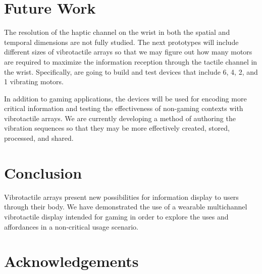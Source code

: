 \documentclass{chi-ext}
\begin{document}
\section{Future Work}
The resolution of the haptic channel on the wrist in both the spatial and temporal dimensions are not fully studied. The next prototypes will include different sizes of vibrotactile arrays so that we may figure out how many motors are required to maximize the information reception through the tactile channel in the wrist. Specifically, are going to build and test devices that include 6, 4, 2, and 1 vibrating motors. 

In addition to gaming applications, the devices will be used for encoding more critical information and testing the effectiveness of non-gaming contexts with vibrotactile arrays. We are currently developing a method of authoring the vibration sequences so that they may be more effectively created, stored, processed, and shared. 


\section{Conclusion}
Vibrotactile arrays present new possibilities for information display to users through their body. We have demonstrated the use of a wearable multichannel vibrotactile display intended for gaming in order to explore the uses and affordances in a non-critical usage scenario. 

\section{Acknowledgements}
\end{document}
